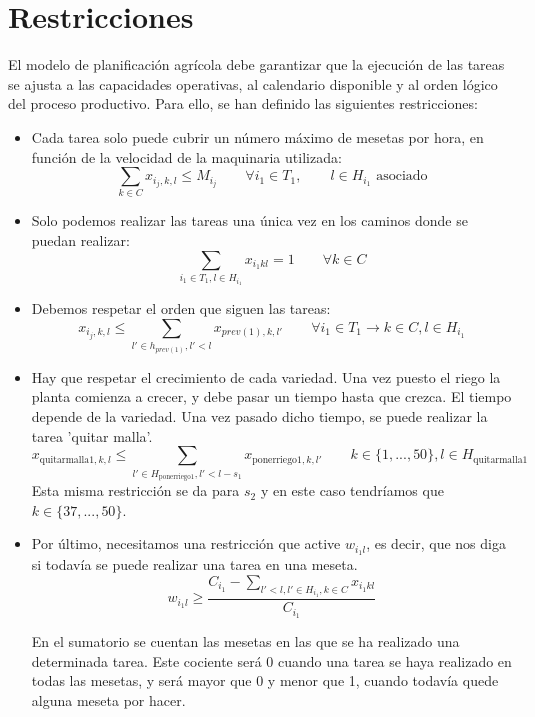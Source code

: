 \section*{Restricciones}
El modelo de planificación agrícola debe garantizar que la ejecución de las tareas se ajusta a las capacidades operativas,
al calendario disponible y al orden lógico del proceso productivo. Para ello, se han definido las siguientes restricciones:
\begin{itemize}
    \item Cada tarea solo puede cubrir un número máximo de mesetas por hora, en función de la velocidad de la maquinaria utilizada:
          \[
            \sum_{k\in C}x_{i_j,k,l} \leq M_{i_j} \qquad \forall i_1 \in T_1, \qquad l\in H_{i_1} \text{   asociado}
          \]
    \item  Solo podemos realizar las tareas una única vez en los caminos donde se puedan realizar:
          \[
            \sum_{i_1 \in T_1, l\in H_{i_1}}x_{i_1 kl} =1 \qquad \forall k \in C
          \]
    \item Debemos respetar el orden que siguen las tareas:
          \[
            x_{i_j,k,l} \leq \sum_{l' \in h_{prev(1)}, l'<l}x_{prev(1),k,l'} \qquad \forall i_1\in T_1 \rightarrow k\in C, l \in H_{i_1}
          \]
    \item Hay que respetar el crecimiento de cada variedad. Una vez puesto el riego la planta comienza a crecer, y debe pasar un tiempo hasta que crezca.
    El tiempo depende de la variedad. Una vez pasado dicho tiempo, se puede realizar la tarea 'quitar malla'.
          \[
            x_{\text{quitarmalla}1,k,l} \leq \sum_{l'\in H_{\text{ponerriego}1}, l'<l-s_1}x_{\text{ponerriego}1,k,l'} \qquad k\in \{1, ..., 50\}, l\in H_{\text{quitarmalla}1} 
          \]
          Esta misma restricción se da para $s_2$ y en este caso tendríamos que $k \in \{37, ..., 50\}$. 
	
    \item Por último, necesitamos una restricción que active $w_{i_1 l}$, es decir, que nos diga si todavía se puede realizar una tarea en una meseta. 
          \[
          \displaystyle w_{i_1 l}\geq \frac{C_{i_1}-\sum_{l'<l, l'\in H_{i_1}, k\in C}x_{i_1 kl}}{C_{i_1}}
          \]
          
          En el sumatorio se cuentan las mesetas en las que se ha realizado una determinada tarea. Este cociente será $0$ cuando una tarea se haya realizado en todas las mesetas, y será mayor que 0 y menor que 1, cuando todavía quede alguna meseta por hacer. 
\end{itemize}


